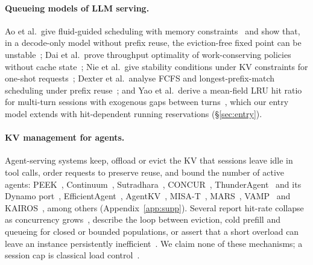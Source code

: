 \paragraph{Queueing models of LLM serving.} Ao et al.\ give fluid-guided scheduling with memory constraints~\citep{ao2025wait} and show
that, in a decode-only model without prefix reuse, the eviction-free fixed point can be unstable~\citep{ao2026service}; Dai et al.\ prove
throughput optimality of work-conserving policies without cache state~\citep{dai2025throughput}; Nie et al.\ give stability conditions
under KV constraints for one-shot requests~\citep{nie2026queueing}; Dexter et al.\ analyse FCFS and longest-prefix-match scheduling under
prefix reuse~\citep{dexter2025prefix}; and Yao et al.\ derive a mean-field LRU hit ratio for multi-turn sessions with exogenous gaps
between turns~\citep{yao2026multiturn}, which our entry model extends with hit-dependent running reservations
(\S\ref{sec:entry}).

\paragraph{KV management for agents.} Agent-serving systems keep, offload or evict the KV that sessions leave idle in tool calls,
order requests to preserve reuse, and bound the number of active agents: PEEK~\citep{xie2026peek}, Continuum~\citep{li2025continuum},
Sutradhara~\citep{biswas2026sutradhara}, CONCUR~\citep{chen2026concur}, ThunderAgent~\citep{kang2026thunderagent} and its Dynamo
port~\citep{dhanani2026dynamo}, EfficientAgent~\citep{shao2026efficientagent}, AgentKV~\citep{anon2026agentkv},
MISA-T~\citep{hong2026misat}, MARS~\citep{wang2026mars}, VAMP~\citep{kim2026vamp} and KAIROS~\citep{yuan2026kairos}, among others
(Appendix~\ref{app:supp}). Several report hit-rate collapse as concurrency grows~\citep{chen2026concur,yuan2026agentic,hong2026misat,%
kim2026vamp}, describe the loop between eviction, cold prefill and queueing for closed or bounded populations, or assert that a short
overload can leave an instance persistently inefficient~\citep{yuan2026kairos}. We claim none of these mechanisms; a session cap is
classical load control~\citep{denning1976optimal,cherkasova2002session}.
